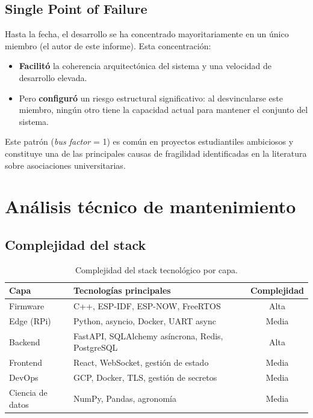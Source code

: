 \subsection{Single Point of Failure}

Hasta la fecha, el desarrollo se ha concentrado mayoritariamente en un
\'unico miembro (el autor de este informe). Esta concentraci\'on:

\begin{itemize}[leftmargin=*]
    \item \textbf{Facilit\'o} la coherencia arquitect\'onica del sistema y
    una velocidad de desarrollo elevada.
    \item Pero \textbf{configur\'o} un riesgo estructural significativo:
    al desvincularse este miembro, ning\'un otro tiene la capacidad
    actual para mantener el conjunto del sistema.
\end{itemize}

Este patr\'on (\textit{bus factor} = 1) es com\'un en proyectos
estudiantiles ambiciosos y constituye una de las principales causas de
fragilidad identificadas en la literatura sobre asociaciones
universitarias.

\section{An\'alisis t\'ecnico de mantenimiento}
\label{sec:tecnico}

\subsection{Complejidad del stack}

\begin{table}[H]
    \centering
    \caption{Complejidad del stack tecnol\'ogico por capa.}
    \label{tab:complejidad}
    \begin{tabular}{lp{6.5cm}c}
        \toprule
        \textbf{Capa} & \textbf{Tecnolog\'ias principales} & \textbf{Complejidad} \\
        \midrule
        Firmware         & C++, ESP-IDF, ESP-NOW, FreeRTOS              & Alta  \\
        Edge (RPi)       & Python, asyncio, Docker, UART async          & Media \\
        Backend          & FastAPI, SQLAlchemy as\'incrona, Redis, PostgreSQL & Alta  \\
        Frontend         & React, WebSocket, gesti\'on de estado        & Media \\
        DevOps           & GCP, Docker, TLS, gesti\'on de secretos      & Media \\
        Ciencia de datos & NumPy, Pandas, agronom\'ia                   & Media \\
        \bottomrule
    \end{tabular}
\end{table}

